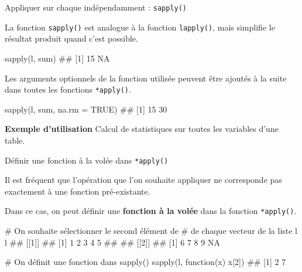 \documentclass[12pt,handout,ignorenonframetext,]{beamer}
\newenvironment{Shaded}{}{}
\newcommand{\KeywordTok}[1]{\textcolor[rgb]{0.00,0.00,1.00}{{#1}}}
\newcommand{\DataTypeTok}[1]{{#1}}
\newcommand{\DecValTok}[1]{{#1}}
\newcommand{\CommentTok}[1]{\textcolor[rgb]{0.00,0.50,0.00}{{#1}}}
\newcommand{\OtherTok}[1]{\textcolor[rgb]{1.00,0.25,0.00}{{#1}}}
\newcommand{\NormalTok}[1]{{#1}}
\renewenvironment{Shaded}{\begin{snugshade}}{\end{snugshade}}
\begin{document}
\begin{frame}[fragile]{\large Appliquer sur chaque indépendamment :
\texttt{sapply()}}

La fonction \texttt{sapply()} est analogue à la fonction
\texttt{lapply()}, mais simplifie le résultat produit quand c'est
possible.

\begin{Shaded}
\begin{Highlighting}[]
\KeywordTok{sapply}\NormalTok{(l, sum)}
  \NormalTok{## [1] 15 NA}
\end{Highlighting}
\end{Shaded}

\pause Les arguments optionnels de la fonction utilisée peuvent être
ajoutés à la suite dans toutes les fonctions \texttt{*apply()}.

\begin{Shaded}
\begin{Highlighting}[]
\KeywordTok{sapply}\NormalTok{(l, sum, }\DataTypeTok{na.rm =} \OtherTok{TRUE}\NormalTok{)}
  \NormalTok{## [1] 15 30}
\end{Highlighting}
\end{Shaded}

\pause \textbf{Exemple d'utilisation} Calcul de statistiques sur toutes
les variables d'une table.

\end{frame}

\begin{frame}[fragile]{\large Définir une fonction à la volée dans
\texttt{*apply()}}

Il est fréquent que l'opération que l'on souhaite appliquer ne
corresponde pas exactement à une fonction pré-existante.

\pause Dans ce cas, on peut définir une \textbf{fonction à la volée}
dans la fonction \texttt{*apply()}.

\footnotesize

\begin{Shaded}
\begin{Highlighting}[]
\CommentTok{# On souhaite sélectionner le second élément de }
\CommentTok{# de chaque vecteur de la liste l}
\NormalTok{l}
  \NormalTok{## [[1]]}
  \NormalTok{## [1] 1 2 3 4 5}
  \NormalTok{## }
  \NormalTok{## [[2]]}
  \NormalTok{## [1]  6  7  8  9 NA}

\CommentTok{# On définit une fonction dans sapply()}
\KeywordTok{sapply}\NormalTok{(l, function(x) x[}\DecValTok{2}\NormalTok{])}
  \NormalTok{## [1] 2 7}
\end{Highlighting}
\end{Shaded}

\end{frame}
\end{document}

